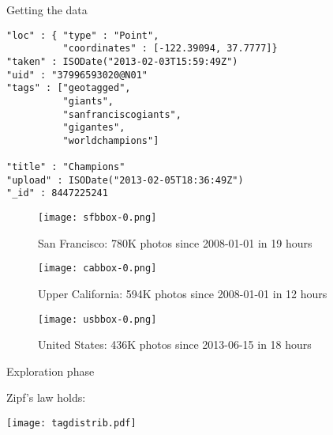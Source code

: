 \begin{frame}[fragile]{Getting the data}

\begin{verbatim}
"loc" : { "type" : "Point",
          "coordinates" : [-122.39094, 37.7777]}
"taken" : ISODate("2013-02-03T15:59:49Z")
"uid" : "37996593020@N01"
"tags" : ["geotagged",
          "giants",
          "sanfranciscogiants",
          "gigantes",
          "worldchampions"]

"title" : "Champions"
"upload" : ISODate("2013-02-05T18:36:49Z")
"_id" : 8447225241
\end{verbatim}

\end{frame}

\begin{frame}

\begin{figure} \texttt{[image: sfbbox-0.png]}
\caption{San Francisco: 780K photos since 2008-01-01 in 19 hours}
\end{figure}

\end{frame}

\begin{frame}

\begin{figure} \texttt{[image: cabbox-0.png]}
\caption{Upper California: 594K photos since 2008-01-01 in 12 hours}
\end{figure}

\end{frame}

\begin{frame}

\begin{figure} \texttt{[image: usbbox-0.png]}
\caption{United States: 436K photos since 2013-06-15 in 18 hours}
\end{figure}

\end{frame}

\begin{frame}{Exploration phase}

Zipf's law holds:

\begin{center} \texttt{[image: tagdistrib.pdf]} \end{center}

\end{frame}

